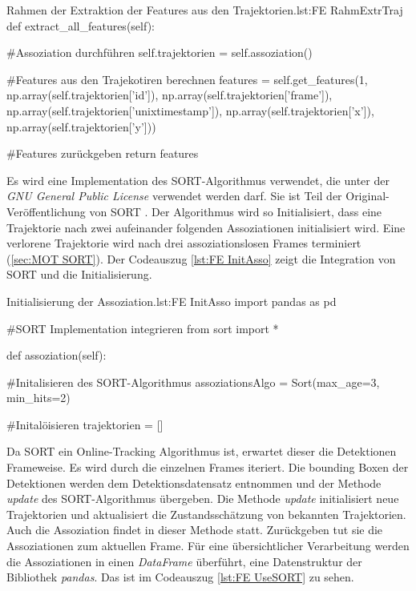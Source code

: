 \begin{pythoncode}{Rahmen der Extraktion der Features aus den Trajektorien.}{lst:FE RahmExtrTraj}
def extract_all_features(self):
    
    #Assoziation durchführen
    self.trajektorien = self.assoziation()

    #Features aus den Trajekotiren berechnen
    features = self.get_features(1, np.array(self.trajektorien['id']), 
                                    np.array(self.trajektorien['frame']), 
                                    np.array(self.trajektorien['unixtimestamp']), 
                                    np.array(self.trajektorien['x']), 
                                    np.array(self.trajektorien['y']))
    
    #Features zurückgeben
    return features
\end{pythoncode}

Es wird eine Implementation des SORT-Algorithmus verwendet, die unter der \textit{GNU General Public License} verwendet werden darf. Sie ist Teil der Original-Veröffentlichung von SORT \cite{Bewley.2016}. Der Algorithmus wird so Initialisiert, dass eine Trajektorie nach zwei aufeinander folgenden Assoziationen initialisiert wird. Eine verlorene Trajektorie wird nach drei assoziationslosen Frames terminiert (\ref{sec:MOT SORT}). Der Codeauszug \ref{lst:FE InitAsso} zeigt die Integration von SORT und die Initialisierung. 

\begin{pythoncode}{Initialisierung der Assoziation.}{lst:FE InitAsso}
import pandas as pd

#SORT Implementation integrieren
from sort import *

def assoziation(self):

    #Initalisieren des SORT-Algorithmus
    assoziationsAlgo = Sort(max_age=3, min_hits=2) 

    #Initalöisieren 
    trajektorien = []

\end{pythoncode}

Da SORT ein Online-Tracking Algorithmus ist, erwartet dieser die Detektionen Frameweise. Es wird durch die einzelnen Frames iteriert. Die bounding Boxen der Detektionen werden dem Detektionsdatensatz entnommen und der Methode \textit{update} des SORT-Algorithmus übergeben. Die Methode \textit{update} initialisiert neue Trajektorien und aktualisiert die Zustandsschätzung von bekannten Trajektorien. Auch die Assoziation findet in dieser Methode statt. Zurückgeben tut sie die Assoziationen zum aktuellen Frame. Für eine übersichtlicher Verarbeitung werden die Assoziationen in einen \textit{DataFrame} überführt, eine Datenstruktur der Bibliothek \textit{pandas}. Das ist im Codeauszug \ref{lst:FE UseSORT} zu sehen.

